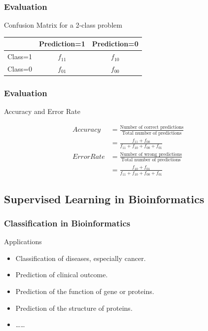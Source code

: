 \documentclass[UTF8]{beamer}\usepackage[]{graphicx}\usepackage[]{color}
\begin{document}
\begin{frame}
  \frametitle{Evaluation}
\begin{center}
Confusion Matrix for a 2-class problem
  \begin{tabular}{|c|c|c|}
\hline
  & Prediction=1 & Prediction=0 \\
\hline
Class=1 & $f_{11}$ & $f_{10}$ \\
\hline
Class=0 & $f_{01}$ & $f_{00}$\\
\hline
  \end{tabular}
\end{center}
\end{frame}


\begin{frame}
  \frametitle{Evaluation}

  \begin{block}{Accuracy and Error Rate}

    \begin{align*}
      Accuracy & = \frac{\text{Number of correct predictions}}{\text{Total number of predictions}}\\
&=\frac{f_{11}+f_{00}}{f_{11}+f_{10}+f_{00}+f_{01}}\\
      Error Rate &= \frac{\text{Number of wrong predictions}}{\text{Total number of predictions}}\\
&=\frac{f_{10}+f_{01}}{f_{11}+f_{10}+f_{00}+f_{01}}
    \end{align*}
  \end{block}
\end{frame}

\subsection{Supervised Learning in Bioinformatics}


\begin{frame}
  \frametitle{Classification in Bioinformatics}

  \begin{block}{Applications}
\begin{itemize}
\item Classification of diseases, especially cancer.
\item Prediction of clinical outcome.
\item Prediction of the function of gene or proteins.
\item Prediction of the structure of proteins.
\item \ldots \ldots
\end{itemize}
  \end{block}
\end{frame}
\end{document}

